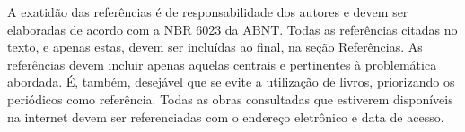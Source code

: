 \documentclass{modelo}
\begin{document}
A exatidão das referências é de responsabilidade dos autores e devem ser elaboradas de acordo com a NBR 6023 da ABNT.
Todas as referências citadas no texto, e apenas estas, devem ser incluídas ao final, na seção Referências.
As referências devem incluir apenas aquelas centrais e pertinentes à problemática abordada. É, também, desejável que se evite a utilização de livros, priorizando os periódicos como referência.
Todas as obras consultadas que estiverem disponíveis na internet devem ser referenciadas com o endereço eletrônico e data de acesso.




%	
%
%
% 
%
     
\end{document}
